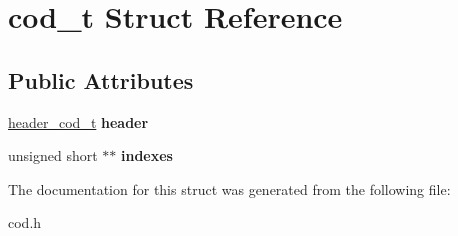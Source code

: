 \hypertarget{structcod__t}{}\section{cod\+\_\+t Struct Reference}
\label{structcod__t}
\subsection*{Public Attributes}
\begin{DoxyCompactItemize}
\item 
\hypertarget{structcod__t_a8fa16b706f79f5f651c482d71803b90b}{}\hyperlink{structheader__cod__t}{header\+\_\+cod\+\_\+t} {\bfseries header}\label{structcod__t_a8fa16b706f79f5f651c482d71803b90b}

\item 
\hypertarget{structcod__t_a0836bb853720eb3e00f191427139a733}{}unsigned short $\ast$$\ast$ {\bfseries indexes}\label{structcod__t_a0836bb853720eb3e00f191427139a733}

\end{DoxyCompactItemize}


The documentation for this struct was generated from the following file\+:\begin{DoxyCompactItemize}
\item 
cod.\+h\end{DoxyCompactItemize}
